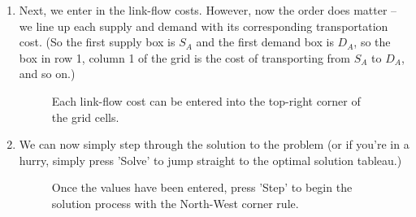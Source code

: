 \documentclass[a4paper,12pt]{article}
\begin{document}
\begin{enumerate}
\item
Next, we enter in the link-flow costs. However, now the order does matter -- we line up each supply and demand with its corresponding transportation cost. (So the first supply box is $S_A$ and the first demand box is $D_A$, so the box in row 1, column 1 of the grid is the cost of transporting from $S_A$ to $D_A$, and so on.) 

\begin{figure}[h!]
\centering
{}
\caption{Each link-flow cost can be entered into the top-right corner of the grid cells.}
\end{figure}

\newpage

\item
We can now simply step through the solution to the problem (or if you're in a hurry, simply press 'Solve' to jump straight to the optimal solution tableau.)

\begin{figure}[h!]
\centering
{}
\caption{Once the values have been entered, press 'Step' to begin the solution process with the North-West corner rule.}
\end{figure}


\end{enumerate}
\end{document}
